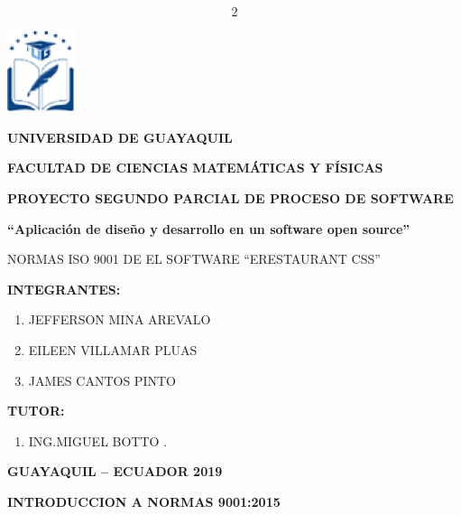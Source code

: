\documentclass{article} %
\begin{document}

\[2\] 



\noindent \includegraphics*[width=0.78in, height=0.96in, keepaspectratio=false]{image1}

\noindent \textbf{}

\noindent \textbf{UNIVERSIDAD DE GUAYAQUIL}

\noindent \textbf{FACULTAD DE CIENCIAS MATEM\'{A}TICAS Y F\'{I}SICAS}

\noindent \textbf{}

\noindent \textbf{PROYECTO SEGUNDO PARCIAL DE PROCESO DE SOFTWARE}

\noindent \textbf{``Aplicaci\'{o}n de dise\~{n}o y desarrollo en un software open source''}

\noindent NORMAS ISO 9001 DE EL SOFTWARE ``ERESTAURANT CSS''

\noindent 

\noindent \textbf{INTEGRANTES:}

\noindent \textbf{}

\begin{enumerate}
\item \textbf{ }JEFFERSON MINA AREVALO

\item  EILEEN VILLAMAR PLUAS

\item  JAMES CANTOS PINTO 
\end{enumerate}

\noindent 

\noindent 

\noindent \textbf{TUTOR:}

\begin{enumerate}
\item \textbf{ }ING.MIGUEL BOTTO .
\end{enumerate}

\noindent 

\noindent \textbf{GUAYAQUIL -- ECUADOR 2019}

\noindent \eject 

\noindent \textbf{INTRODUCCION A NORMAS 9001:2015}
\end{document}
